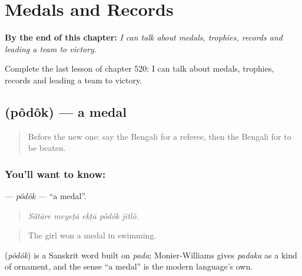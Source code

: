 
\chapter{Medals and Records}
\label{ch:bn-medals-and-records}

\begin{chapteropening}
\textbf{By the end of this chapter:} \emph{I can talk about medals, trophies, records and leading a team to victory.}

Complete the last lesson of chapter 520: I can talk about medals, trophies, records and leading a team to victory.
\end{chapteropening}

\section[\texorpdfstring{\bn{পদক} (pôdôk)}{পদক (pôdôk)}]{ (pôdôk) — a medal}

\label{lesson:BN-C520-podok}



\begin{quote}
Before the new one: say the Bengali for a referee, then the Bengali for to be beaten.
\end{quote}

\subsection*{You'll want to know: }
\textbf{} — \emph{pôdôk} — \textquotedblleft{}a medal\textquotedblright{}.

\begin{quote}
    
\end{quote}

\begin{quote}
\emph{Sā̃tāre meyeṭā ekṭā pôdôk jitlô.}
\end{quote}

\begin{quote}
The girl won a medal in swimming.
\end{quote}

\begin{cousinweb}
\textbf{} (\emph{pôdôk}) is a Sanskrit word built on \emph{pada}; Monier-Williams gives \emph{padaka} as a kind of ornament, and the sense \textquotedblleft{}a medal\textquotedblright{} is the modern language's own.
\end{cousinweb}

